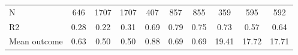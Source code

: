 \begin{tabular}{lccc|ccc|ccc}
N           &         646         &        1707         &        1707         &         407         &         857         &         855         &         359         &         595         &         592         \\
R2          &        0.28         &        0.22         &        0.31         &        0.69         &        0.79         &        0.75         &        0.73         &        0.57         &        0.64         \\
Mean outcome&        0.63         &        0.50         &        0.50         &        0.88         &        0.69         &        0.69         &       19.41         &       17.72         &       17.71         \\
\bottomrule \end{tabular}
